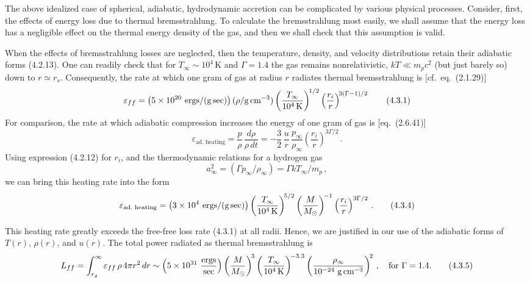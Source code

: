 The above idealized case of spherical, adiabatic, hydrodynamic accretion can be
complicated by various physical processes.  Consider, first, the effects of energy
loss due to thermal bremsstrahlung.  To calculate the bremsstrahlung most easily,
we shall assume that the energy loss has a negligible effect on the thermal energy
density of the gas, and then we shall check that this assumption is valid.

When the effects of bremsstrahlung losses are neglected, then the temperature,
density, and velocity distributions retain their adiabatic forms (4.2.13).  One can
readily check that for $T_\infty \sim 10^4$\,K and $\Gamma = 1.4$ the gas remains nonrelativistic,
$kT \ll m_p c^2$ (but just barely so) down to $r \simeq r_s$.  Consequently, the rate at which
one gram of gas at radius $r$ radiates thermal bremsstrahlung is [cf.\ eq.~(2.1.29)]
%
\begin{equation}
\varepsilon_{ff}
= \bigl(5 \times 10^{20}~\text{ergs/(g\,sec)}\bigr)\,
  (\rho / \text{g\,cm}^{-3})
  \left(\frac{T_\infty}{10^4\,\text{K}}\right)^{\!1/2}
  \left(\frac{r_i}{r}\right)^{\!3(\Gamma-1)/2}
\tag{4.3.1}
\end{equation}
%
For comparison, the rate at which adiabatic compression increases the energy of
one gram of gas is [eq.~(2.6.41)]
%
\begin{equation}
\varepsilon_{\text{ad.\ heating}}
= \frac{p}{\rho}\,\frac{d\rho}{\rho\,dt}
= -\frac{3}{2}\,\frac{u}{r}\,\frac{p_\infty}{\rho_\infty}
  \left(\frac{r_i}{r}\right)^{3\Gamma/2}\,.
\tag{4.3.2}
\end{equation}
%
Using expression (4.2.12) for $r_i$, and the thermodynamic relations for a hydro\-gen gas
%
\begin{equation}
a_\infty^2 = (\Gamma p_\infty / \rho_\infty) = \Gamma kT_\infty / m_p\,,
\tag{4.3.3}
\end{equation}
%
we can bring this heating rate into the form
%
\begin{equation}
\varepsilon_{\text{ad.\ heating}}
= \bigl(3 \times 10^4~\text{ergs}/(\text{g\,sec})\bigr)
  \left(\frac{T_\infty}{10^4\,\text{K}}\right)^{\!5/2}
  \left(\frac{M}{M_\odot}\right)^{\!-1}
  \left(\frac{r_i}{r}\right)^{3\Gamma/2}\,.
\tag{4.3.4}
\end{equation}

This heating rate greatly exceeds the free-free loss rate (4.3.1) at all radii.  Hence,
we are justified in our use of the adiabatic forms of $T(r)$, $\rho(r)$, and $u(r)$.  The total
power radiated as thermal bremsstrahlung is
%
\begin{equation}
L_{ff}
= \int_{r_g}^{\infty} \varepsilon_{ff}\,\rho\, 4\pi r^2\, dr
\sim \left(5 \times 10^{31}~\frac{\text{ergs}}{\text{sec}}\right)
  \left(\frac{M}{M_\odot}\right)^{\!3}
  \left(\frac{T_\infty}{10^4\,\text{K}}\right)^{\!-3.3}
  \left(\frac{\rho_\infty}{10^{-24}~\text{g\,cm}^{-3}}\right)^{\!2}\,,
  \quad\text{for }\Gamma = 1.4.
\tag{4.3.5}
\end{equation}

